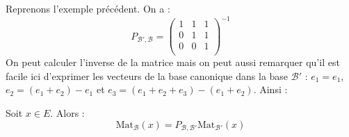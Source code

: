 \documentclass[french,11pt,twoside]{VcCours}
\begin{document}
\begin{Exemple} Reprenons l'exemple précédent. On a :
$$ P_{\mathcal{B}', \mathcal{B}} = \begin{pmatrix}
1 & 1 & 1 \\
0 & 1 & 1 \\
0 & 0& 1 \\
\end{pmatrix}^{-1}$$
On peut calculer l'inverse de la matrice mais on peut aussi remarquer qu'il est facile ici d'exprimer les vecteurs de la base canonique dans la base $\mathcal{B}'$ : $e_1=e_1$, $e_2 =(e_1+e_2)-e_1$ et $e_3 = (e_1+e_2+e_3)-(e_1+e_2)$. Ainsi :

\vspace{3cm}
\end{Exemple}

\begin{Proposition}{} Soit $x \in E$. Alors :
$$ \textrm{Mat}_{\mathcal{B}}(x) = P_{\mathcal{B}, \mathcal{B}'} \textrm{Mat}_{\mathcal{B}'}(x)$$
\end{Proposition}

\end{document}
